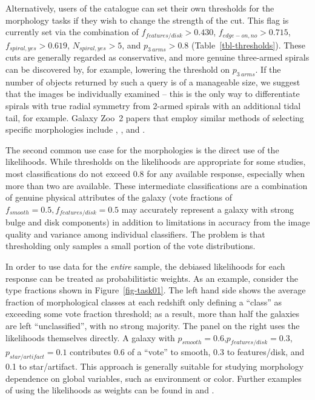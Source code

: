 \documentclass[useAMS,usenatbib]{mn2e}
\begin{document}
Alternatively, users of the catalogue can set their own thresholds for the morphology tasks if they wish to change the strength of the cut. This flag is currently set via the combination of $f_{features/disk}>0.430$, $f_{edge-on,no}>0.715$, $f_{spiral,yes}>0.619$, $N_{spiral,yes}>5$, and $p_{3~arms}>0.8$ (Table~\ref{tbl-thresholds}). These cuts are generally regarded as conservative, and more genuine three-armed spirals can be discovered by, for example, lowering the threshold on $p_{3~arms}$. If the number of objects returned by such a query is of a manageable size, we suggest that the images be individually examined -- this is the only way to differentiate spirals with true radial symmetry from 2-armed spirals with an additional tidal tail, for example. Galaxy Zoo~2 papers that employ similar methods of selecting specific morphologies include \citet{mas11c}, \citet{kav12a}, and \citet{sim13}. 

The second common use case for the morphologies is the direct use of the likelihoods. While thresholds on the likelihoods are appropriate for some studies, most classifications do not exceed 0.8 for any available response, especially when more than two are available. These intermediate classifications are a combination of genuine physical attributes of the galaxy (vote fractions of $f_{smooth}=0.5,f_{features/disk}=0.5$ may accurately represent a galaxy with strong bulge and disk components) in addition to limitations in accuracy from the image quality and variance among individual classifiers. The problem is that thresholding only samples a small portion of the vote distributions.

In order to use data for the {\it entire} sample, the debiased likelihoods for each response can be treated as probabilitistic weights. As an example, consider the type fractions shown in Figure~\ref{fig-task01}. The left hand side shows the average fraction of morphological classes at each redshift only defining a ``class'' as exceeding some vote fraction threshold; as a result, more than half the galaxies are left ``unclassified'', with no strong majority. The panel on the right uses the likelihoods themselves directly. A galaxy with $p_{smooth}=0.6$,$p_{features/disk}=0.3$,$p_{star/artifact}=0.1$ contributes 0.6 of a ``vote'' to smooth, 0.3 to features/disk, and 0.1 to star/artifact. This approach is generally suitable for studying morphology dependence on global variables, such as environment or color. Further examples of using the likelihoods as weights can be found in \citet{bam09} and \citet{ski12}.
\end{document}
